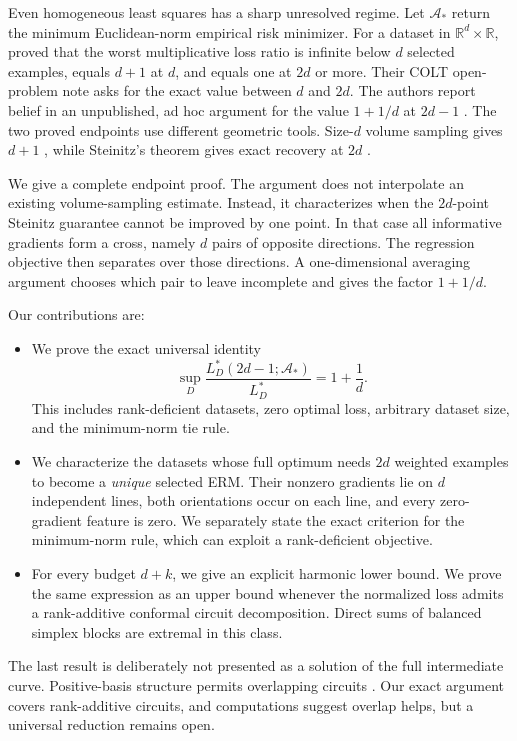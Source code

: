 \documentclass[twoside]{article}
\newcommand{\R}{\mathbb R}
\newcommand{\cA}{\mathcal A}
\begin{document}
Even homogeneous least squares has a sharp unresolved regime. Let $\cA_*$ return the minimum Euclidean-norm empirical risk minimizer. For a dataset in $\R^d\times\R$, \citet{hanneke2025data} proved that the worst multiplicative loss ratio is infinite below $d$ selected examples, equals $d+1$ at $d$, and equals one at $2d$ or more. Their COLT open-problem note asks for the exact value between $d$ and $2d$. The authors report belief in an unpublished, ad hoc argument for the value $1+1/d$ at $2d-1$ \citep{hanneke2025open}. The two proved endpoints use different geometric tools. Size-$d$ volume sampling gives $d+1$ \citep{derezinski2017unbiased,derezinski2018reverse}, while Steinitz's theorem gives exact recovery at $2d$ \citep{steinitz1916bedingt}.

We give a complete endpoint proof. The argument does not interpolate an existing volume-sampling estimate. Instead, it characterizes when the $2d$-point Steinitz guarantee cannot be improved by one point. In that case all informative gradients form a cross, namely $d$ pairs of opposite directions. The regression objective then separates over those directions. A one-dimensional averaging argument chooses which pair to leave incomplete and gives the factor $1+1/d$.

Our contributions are:
\begin{itemize}
\item We prove the exact universal identity
\begin{equation}
  \sup_D \frac{L_D^*(2d-1;\cA_*)}{L_D^*}=1+\frac1d.
  \label{eq:headline}
\end{equation}
This includes rank-deficient datasets, zero optimal loss, arbitrary dataset size, and the minimum-norm tie rule.
\item We characterize the datasets whose full optimum needs $2d$ weighted
examples to become a \emph{unique} selected ERM. Their nonzero gradients lie on $d$ independent lines, both orientations occur on each line, and every zero-gradient feature is zero. We separately state the exact criterion for the minimum-norm rule, which can exploit a rank-deficient objective.
\item For every budget $d+k$, we give an explicit harmonic lower bound.
We prove the same expression as an upper bound whenever the normalized loss admits a rank-additive conformal circuit decomposition. Direct sums of balanced simplex blocks are extremal in this class.
\end{itemize}

The last result is deliberately not presented as a solution of the full intermediate curve. Positive-basis structure permits overlapping circuits \citep{davis1954positive,schoch2020simplicial,hare2021positive}. Our exact argument covers rank-additive circuits, and computations suggest overlap helps, but a universal reduction remains open.
\end{document}
